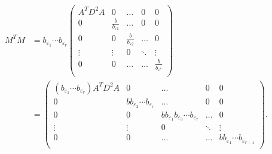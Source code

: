 \begin{align*}
M^TM &= b_{\varepsilon_1}\cdots b_{\varepsilon_r}\begin{pmatrix}
	A^TD^2A & 0 & \dots & 0 & 0\\
	0 & \frac{b}{b_{\varepsilon 1}} & \dots & 0 & 0\\
	0 & 0  & \frac{b}{b_{\varepsilon 2}} & \dots & 0\\
	\vdots & \vdots &0 &  \ddots & \vdots\\ 
	0 & 0 & \dots & \dots & \frac{b}{b_{\varepsilon^*}} \\
	\end{pmatrix}\\
	& = \begin{pmatrix}
	(b_{\varepsilon_1}\cdots b_{\varepsilon_r})A^TD^2A & 0 & \dots & 0 & 0\\
	0 & b b_{\varepsilon_2}\cdots b_{\varepsilon_r} & \dots & 0 & 0\\
	0 & 0  & bb_{\varepsilon_1}b_{\varepsilon_3}\cdots b_{\varepsilon_r} & \dots & 0\\
	\vdots & \vdots &0 &  \ddots & \vdots\\ 
	0 & 0 & \dots & \dots & bb_{\varepsilon_1}\cdots b_{\varepsilon_{r-1}} \\
	\end{pmatrix}.
\end{align*}	
	
